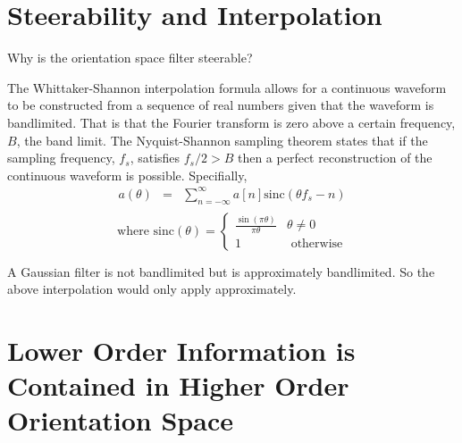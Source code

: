 \documentclass{article}
\begin{document}
\section{Steerability and Interpolation}
Why is the orientation space filter steerable?
\par
The Whittaker-Shannon interpolation formula allows for a continuous waveform to be constructed from a sequence of real numbers given that the waveform is bandlimited. That is that the Fourier transform is zero above a certain frequency, $ B $, the band limit. The Nyquist-Shannon sampling theorem states that if the sampling frequency, $ f_s $, satisfies $ f_s/2 > B $ then a perfect reconstruction of the continuous waveform is possible. Specifially,
\begin{eqnarray}
        a(\theta) & = & \sum^\infty_{n=-\infty} a\left[n\right] \mbox{sinc}(\theta f_s - n) \\
\end{eqnarray}
\[
        \mbox{where } \mbox{sinc}(\theta) =
        \begin{cases}
               \frac{ \sin(\pi \theta) }{\pi \theta} & \theta \neq 0 \\
                                     1 &      \mbox{ otherwise}
        \end{cases}
\]
\par
A Gaussian filter is not bandlimited but is approximately bandlimited. So the above interpolation would only apply approximately.
\section{Lower Order Information is Contained in Higher Order Orientation Space}
\end{document}
